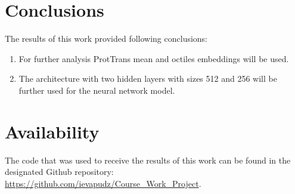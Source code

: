 \documentclass[12pt]{article}
\begin{document}
	\newpage

	\section{Conclusions}

	The results of this work provided following conclusions:

	\begin{enumerate}
		\item For further analysis ProtTrans mean and octiles embeddings will be used.
        \item The architecture with two hidden layers with sizes 512 and 256 will be further used for the neural network model.
	\end{enumerate}

	\section{Availability}

	The code that was used to receive the results of this work can be found
	in the designated Github repository: 
	\href{https://github.com/ievapudz/Course_Work_Project}{https://github.com/ievapudz/Course\_Work\_Project}.

	\newpage
	
	\nocite{*}
	
	\normalsize

 

\end{document}
